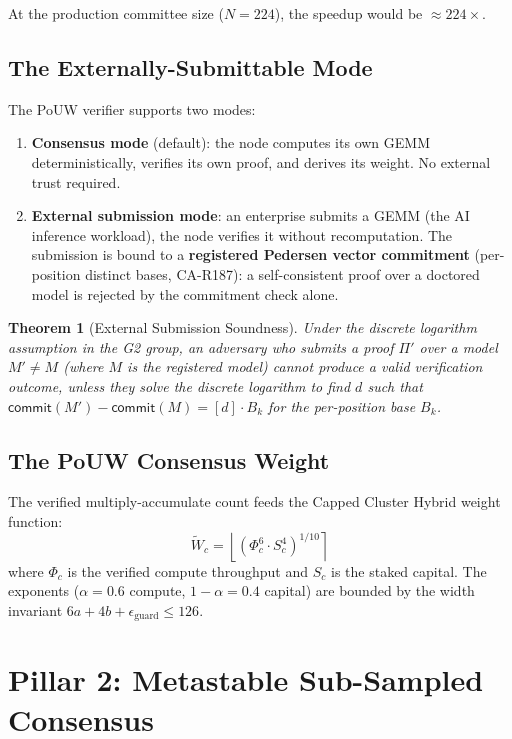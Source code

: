 \documentclass[11pt, a4paper]{article}
\newtheorem{theorem}{Theorem}
\begin{document}
At the production committee size ($N = 224$), the speedup would be $\approx 224\times$.

\subsection{The Externally-Submittable Mode}

The PoUW verifier supports two modes:
\begin{enumerate}
\item \textbf{Consensus mode} (default): the node computes its own GEMM deterministically, verifies its own proof, and derives its weight. No external trust required.
\item \textbf{External submission mode}: an enterprise submits a GEMM (the AI inference workload), the node verifies it without recomputation. The submission is bound to a \textbf{registered Pedersen vector commitment} (per-position distinct bases, CA-R187): a self-consistent proof over a doctored model is rejected by the commitment check alone.
\end{enumerate}

\begin{theorem}[External Submission Soundness]
\label{thm:ext-submission}
Under the discrete logarithm assumption in the G2 group, an adversary who submits a proof $\Pi'$ over a model $M' \neq M$ (where $M$ is the registered model) cannot produce a valid verification outcome, unless they solve the discrete logarithm to find $d$ such that $\textsf{commit}(M') - \textsf{commit}(M) = [d] \cdot B_k$ for the per-position base $B_k$.
\end{theorem}

\subsection{The PoUW Consensus Weight}

The verified multiply-accumulate count feeds the Capped Cluster Hybrid weight function:
\begin{equation}
\tilde{W}_c = \left\lfloor (\Phi_c^6 \cdot S_c^4)^{1/10} \right\rceil
\end{equation}
where $\Phi_c$ is the verified compute throughput and $S_c$ is the staked capital. The exponents ($\alpha = 0.6$ compute, $1-\alpha = 0.4$ capital) are bounded by the width invariant $6a + 4b + \epsilon_{\text{guard}} \le 126$.

\section{Pillar 2: Metastable Sub-Sampled Consensus}
\end{document}
